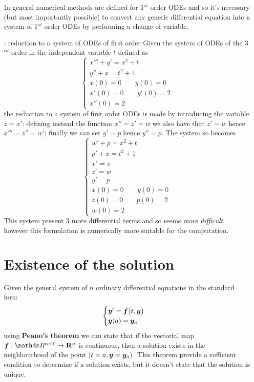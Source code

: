	In general numerical methods are defined for 1$^{st}$ order ODEs and so it's necessary (but most importantly possible) to convert any generic differential equation into a system of 1$^{st}$ order ODEs by performing a change of variable.
	
	\begin{example}{: reduction to a system of ODEs of first order}
		Given the system of ODEs of the 3$^{rd}$ order in the independent variable $t$ defined as
		\[ \begin{cases}
			x''' + y' = x^2 + t \\ 
			y'' + x = t^2 + 1 \\
			x(0) = 0 \qquad y(0) = 0 \\
			x'(0) = 0 \qquad y'(0) = 2 \\
			x''(0) = 2
		\end{cases} \]
		the reduction to a system of first order ODEs is made by introducing the variable $z = x'$; defining instead the function $x'' = z' = w$ we also have that $z' = w$ hence $x''' =z'' = w'$; finally we can set $y' = p$ hence $y'' = p$. The system so becomes
		\[ \begin{cases}
			w' + p = x^2 + t \\ 
			p' + x = t^2 + 1 \\
			x' = z \\ 
			z' = w \\
			y' = p \\
			x(0) = 0 \qquad y(0) = 0 \\
			z(0) = 0 \qquad p(0) = 2 \\
			w(0) = 2
		\end{cases} \]
		This system present 3 more differential terms and so seems \textit{more difficult}, however this formulation is numerically more suitable for the computation.
	\end{example}
	
\section{Existence of the solution}
	Given the general system of $n$ ordinary differential equations in the standard form
	\[ \begin{cases}
		\boldsymbol{y}' = \boldsymbol{f}\big(t,\boldsymbol{y}\big) \\ \boldsymbol{y}(a) = \boldsymbol{y}_a
	\end{cases} \]
	using \textbf{Peano's theorem} we can state that if the vectorial map $\vett f: \mathds R^{n+1} \rightarrow \R^n$ is continuous, then a solution exists in the neighbourhood of the point $(t=a,\boldsymbol{y} = \boldsymbol{y}_a)$. This theorem provide a sufficient condition to determine if a solution exists, but it doesn't state that the solution is unique.
	
